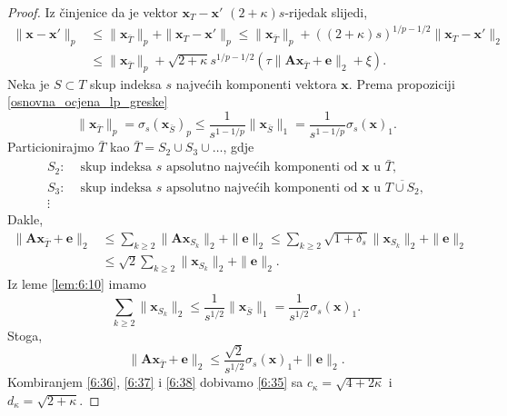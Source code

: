 \documentclass[a4paper,twoside,12pt]{memoir} %
\newcommand{\vect}[1]{\mathbf{#1}}
\renewcommand{\vec}{\vect}
\newcommand{\norm}[1]{\|{#1}\|}
\begin{document}
\begin{proof}
    Iz \v{c}injenice da je vektor $\vec x_T - \vec x'$ $(2+\kappa)s$-rijedak slijedi,
    \begin{align}
        \norm{\vec x - \vec x'}_p & \leq \norm{\vec x_{\bar T}}_p + \norm{\vec x_T - \vec x'}_p \leq \norm{\vec x_{\bar T}}_p + ((2+ \kappa)s)^{1/p-1/2} \norm{\vec x_T - \vec x'}_2 \nonumber  \\[0.5em]
        & \leq \norm{\vec x_{\bar T}}_p + \sqrt{2+ \kappa}s^{1/p - 1/2}(\tau \norm{\vec{Ax}_{\bar T} + \vec e}_2 + \xi). \label{6:36}
    \end{align}
    Neka je $S \subset T$ skup indeksa $s$ najve\'cih komponenti vektora $\vec x$. Prema propoziciji \ref{osnovna_ocjena_lp_greske}
    \begin{equation}\label{6:37}
        \norm{\vec x_{\bar T}}_p = \sigma_s(\vec x_{\bar S})_p \leq \frac{1}{s^{1-1/p}} \norm{\vec x_{\bar S}}_1 = \frac{1}{s^{1 - 1/p}} \sigma_s(\vec x)_1.  
    \end{equation}
    Particionirajmo $\bar T$ kao $\bar T = S_2 \cup S_3 \cup \dots$, gdje
    \begin{align*}
        S_2:& \text{ skup indeksa $s$ apsolutno najve\'cih komponenti od $\vec x$ u $\bar T$},\\[0.5em]
        S_3:& \text{ skup indeksa $s$ apsolutno najve\'cih komponenti od $\vec x$ u $\overline{T \cup S_2}$},\\[0.5em]
        \vdots
    \end{align*}
    Dakle,
    \begin{align*}
        \norm{\vec{Ax}_{\bar T} + \vec e}_2 & \leq \sum_{k \geq 2} \norm{\vec{Ax}_{S_k}}_2 + \norm{\vec e}_2 \leq \sum_{k \geq 2} \sqrt{1+\delta_s} \norm{\vec x_{S_k}}_2 + \norm{\vec e}_2 \\[0.5em]
        & \leq \sqrt{2} \sum_{k \geq 2} \norm{\vec x_{S_k}}_2 + \norm{\vec e}_2.
    \end{align*}
    Iz leme \ref{lem:6:10} imamo
    \begin{equation*}
        \sum_{k \geq 2} \norm{\vec x_{S_k}}_2 \leq \frac{1}{s^{1/2}} \norm{\vec x_{\bar S}}_1 = \frac{1}{s^{1/2}} \sigma_s(\vec x)_1.  
    \end{equation*}
    Stoga,
    \begin{equation}\label{6:38}
        \norm{\vec{Ax}_{\bar T} + \vec e}_2 \leq \frac{\sqrt{2}}{s^{1/2}} \sigma_s(\vec x)_1 + \norm{\vec e}_2. 
    \end{equation}
    Kombiranjem \eqref{6:36}, \eqref{6:37} i \eqref{6:38} dobivamo \eqref{6:35} sa $c_{\kappa} = \sqrt{4+2 \kappa}$ i $d_{\kappa} = \sqrt{2 + \kappa}$.
\end{proof}
\end{document}
